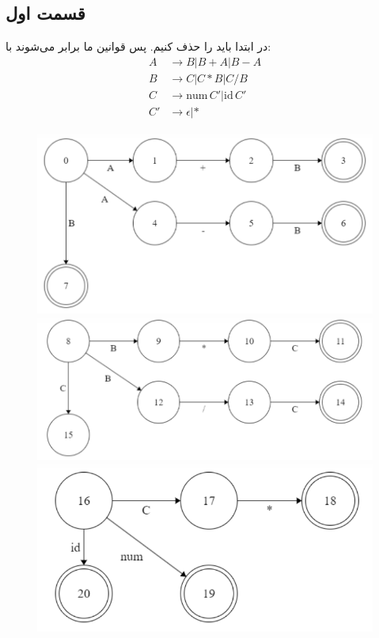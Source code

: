 \documentclass[]{article}
\begin{document}
\subsection*{قسمت اول}
در ابتدا باید
را حذف کنیم. پس قوانین ما برابر می‌شوند با:
\begin{align*}
    A &\rightarrow B | B + A | B - A\\
    B &\rightarrow C | C * B | C / B\\
    C &\rightarrow \text{num} \, C' | \text{id} \, C'\\
    C' &\rightarrow \epsilon | *
\end{align*}
\begin{figure}[H]
    \centering
    \includegraphics[scale=0.5]{figure/5-1-A.png}
    \includegraphics[scale=0.5]{figure/5-1-B.png}
    \includegraphics[scale=0.5]{figure/5-1-C.png}
\end{figure}
\end{document}
